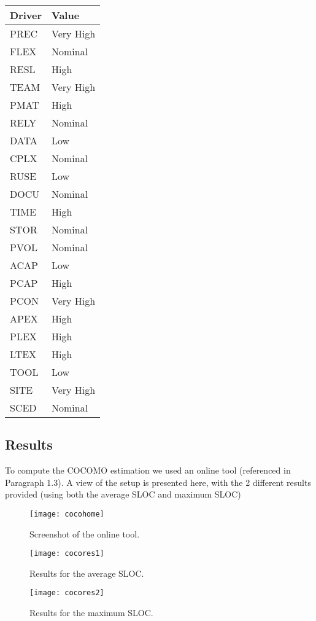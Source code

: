 \begin{center}
\begin{tabular}{| l | l |}
    \hline
    \textbf{Driver} & \textbf{Value} \\ \hline
    PREC & Very High \\
    FLEX & Nominal\\ 
    RESL & High\\ 
    TEAM & Very High\\ 
    PMAT & High\\ \hline
    RELY & Nominal\\ 
    DATA & Low\\
    CPLX & Nominal\\
    RUSE & Low\\
    DOCU & Nominal\\ \hline
    TIME & High\\     
    STOR & Nominal\\
    PVOL & Nominal\\ \hline
    ACAP & Low\\
    PCAP & High\\
    PCON & Very High\\    
    APEX & High\\  
    PLEX & High\\ 
    LTEX & High\\ \hline
    TOOL & Low\\
    SITE & Very High\\   
    SCED & Nominal\\ 
    \hline
    \end{tabular}
\end{center}

\subsection{Results}
To compute the COCOMO estimation we used an online tool (referenced in Paragraph 1.3). A view of the setup is presented here, with the 2 different results provided (using both the average SLOC and maximum SLOC)

\begin{figure}
  \centering
  \texttt{[image: cocohome]}
  \caption{Screenshot of the online tool.}
\end{figure}

\begin{figure}
  \centering
  \texttt{[image: cocores1]}
  \caption{Results for the average SLOC.}
\end{figure}

\begin{figure}
  \centering
  \texttt{[image: cocores2]}
  \caption{Results for the maximum SLOC.}
\end{figure}
